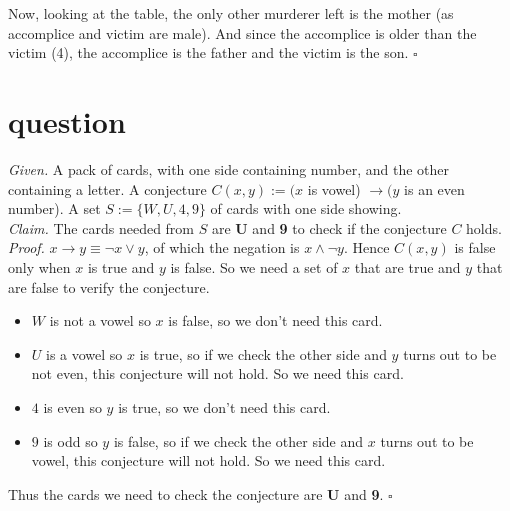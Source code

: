 \documentclass[11pt]{article}
\begin{document}
~\\
~\\
Now, looking at the table, the only other murderer left is the mother (as accomplice and victim are male). And since the accomplice is older than the victim (4), the accomplice is the father and the victim is the son. \hfill $\square$








\section{question}
\emph{Given. } A pack of cards, with one side containing number, and the other containing a letter. A conjecture $C(x, y) := (x$ is vowel) $\rightarrow (y$ is an even number). A set $S := \{W, U, 4, 9\}$ of cards with one side showing. \medskip \\
\emph{Claim. } The cards needed from $S$ are $\mathbf{U}$ and \textbf{9} to check if the conjecture $C$ holds. \medskip \\
\emph{Proof. } $x \to y \equiv \neg x \lor y$, of which the negation is $x \land \neg y$. Hence $C(x,y)$ is false only when $x$ is true and $y$ is false. So we need a set of $x$ that are true and $y$ that are false to verify the conjecture. 
\begin{itemize}
\renewcommand{\labelitemi}{$\hookrightarrow$}
    \item $W$ is not a vowel so $x$ is false, so we don't need this card. 
    \item $U$ is a vowel so $x$ is true, so if we check the other side and $y$ turns out to be not even, this conjecture will not hold. So we need this card. 
    \item $4$ is even so $y$ is true, so we don't need this card. 
    \item $9$ is odd so $y$ is false, so if we check the other side and $x$ turns out to be vowel, this conjecture will not hold. So we need this card. 
    \end{itemize}
Thus the cards we need to check the conjecture are $\mathbf{U}$ and \textbf{9}.  \hfill $\square$
\end{document}
